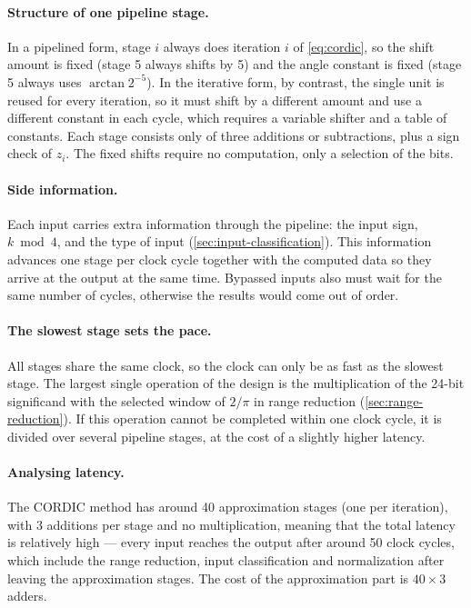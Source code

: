 \paragraph{Structure of one pipeline stage.}
In a pipelined form, stage $i$ always does iteration $i$ of \cref{eq:cordic}, so
the shift amount is fixed (stage 5 always shifts by 5)
and the angle constant is fixed (stage 5 always uses $\arctan 2^{-5}$). In the iterative form,
by contrast, the single unit is reused for every iteration, so it must shift by a different
amount and use a different constant in each cycle, which requires a variable shifter and a
table of constants.
Each stage consists only of three additions or subtractions, plus a sign check of $z_{i}$.
The fixed shifts require no computation, only a selection of the bits.

\paragraph{Side information.}
\label{pa:side-info}
Each input carries extra information through the pipeline: the input sign, $k \bmod 4$,
and the type of input (\cref{sec:input-classification}). This information advances
one stage per clock cycle
together with the computed data so they arrive at the output at the same time.
Bypassed inputs also must wait for the same number of cycles, otherwise the results
would come out of order.

\paragraph{The slowest stage sets the pace.}
All stages share the same clock, so the clock can only be as fast
as the slowest stage. The largest single operation of the design is the multiplication of the 24-bit significand
with the selected window of $2/\pi$ in range reduction (\cref{sec:range-reduction}).
If this operation cannot be completed within one clock cycle, it is divided
over several pipeline stages, at the cost of a slightly higher latency.

\paragraph{Analysing latency.}
The CORDIC method has around 40 approximation stages (one per iteration), with 3 additions per stage and no
multiplication, meaning that the total latency is relatively high --- every input reaches the output after
around 50 clock cycles, which include the range reduction, input classification and normalization after leaving
the approximation stages. The cost of the approximation part is $40 \times 3$ adders.

